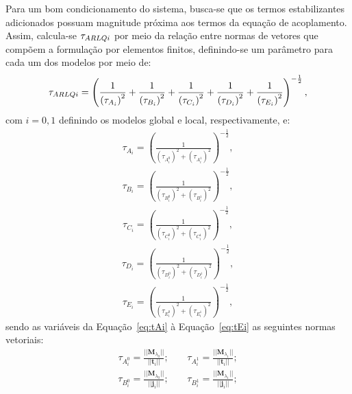 Para um bom condicionamento do sistema, busca-se que os termos estabilizantes adicionados possuam magnitude próxima aos termos da equação de acoplamento. Assim, calcula-se $\tau_{ARLQi}$ por meio da relação entre normas de vetores que compõem a formulação por elementos finitos, definindo-se um parâmetro para cada um dos modelos por meio de:
\begin{align}
	\tau_{ARLQi} = \left(\frac{1}{\left(\tau_{A_i}\right)^{2}} + \frac{1}{\left(\tau_{B_i}\right)^{2}} +  \frac{1}{\left(\tau_{C_i}\right)^{2}} + 
	\frac{1}{\left(\tau_{D_i}\right)^{2}} +
	\frac{1}{\left(\tau_{E_i}\right)^{2}}
	\right)^{-\frac{1}{2}},
\end{align}
\noindent com $i=0,1$ definindo os modelos global e local, respectivamente, e:
\begin{align}
	\tau_{A_{i}} = \left(\frac{1}{\left(\tau_{A_i^{0}}\right)^{2} + \left(\tau_{A_i^{1}}\right)^{2}} \right)^{-\frac{1}{2}}, \label{eq:tAi}
\end{align}
\begin{align}
	\tau_{B_{i}} = \left(\frac{1}{\left(\tau_{B_i^{0}}\right)^{2} + \left(\tau_{B_i^{1}}\right)^{2}} \right)^{-\frac{1}{2}},
\end{align}
\begin{align}
	\tau_{C_{i}} = \left(\frac{1}{\left(\tau_{C_i^{0}}\right)^{2} + \left(\tau_{C_i^{1}}\right)^{2}} \right)^{-\frac{1}{2}},
\end{align}
\begin{align}
	\tau_{D_{i}} = \left(\frac{1}{\left(\tau_{D_i^{0}}\right)^{2} + \left(\tau_{D_i^{1}}\right)^{2}} \right)^{-\frac{1}{2}},
\end{align}
\begin{align}
	\tau_{E_{i}} = \left(\frac{1}{\left(\tau_{E_i^{0}}\right)^{2} + \left(\tau_{E_i^{1}}\right)^{2}} \right)^{-\frac{1}{2}},\label{eq:tEi}
\end{align}
\noindent sendo as variáveis da Equação~\eqref{eq:tAi} à Equação~\eqref{eq:tEi} as seguintes normas vetoriais:
\begin{align}
	\tau_{A_i^{0}} = \frac{|| \mathbf{M}_{\lambda_0} || }{||\mathbf{t}_{i} ||}; \ \ \ \ \  & \tau_{A_i^{1}} = \frac{|| \mathbf{M}_{\lambda_1} || }{||\mathbf{t}_{i} ||};
\end{align}
\begin{align}
	\tau_{B_i^{0}} = \frac{|| \mathbf{M}_{\lambda_0} || }{||\mathbf{j}_{i} ||}; \ \ \ \ \  &  \tau_{B_i^{1}} = \frac{|| \mathbf{M}_{\lambda_1} || }{||\mathbf{j}_{i} ||}; 
\end{align}
